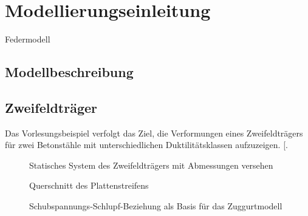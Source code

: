 \documentclass[
  11pt,
  letterpaper,
]{scrreprt}
\begin{document}

\chapter{Modellierungseinleitung}\label{modellierungseinleitung}

Federmodell

\section{Modellbeschreibung}\label{modellbeschreibung}

\section{Zweifeldträger}\label{zweifeldtruxe4ger}

Das Vorlesungsbeispiel verfolgt das Ziel, die Verformungen eines
Zweifeldträgers für zwei Betonstähle mit unterschiedlichen
Duktilitätsklassen aufzuzeigen.
{[}\citeproc{ref-jager_stahlbeton_2009}{2}{]}.

\begin{figure}[H]


\caption{\label{fig-jag_system}Statisches System des Zweifeldträgers mit
Abmessungen versehen}

\end{figure}%

\begin{figure}[H]


\caption{\label{fig-jag_system_qs}Querschnitt des Plattenstreifens}

\end{figure}%

\begin{figure}[H]


\caption{\label{fig-jag_tau_delta}Schubspannungs-Schlupf-Beziehung als
Basis für das Zuggurtmodell}

\end{figure}%
\end{document}
